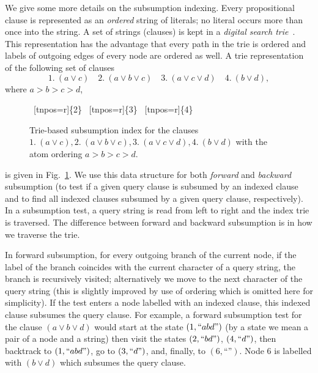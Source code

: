 \documentclass[11pt]{article}
\begin{document}
We give some more details on the subsumption indexing. Every
propositional clause is represented as an \emph{ordered} string of
literals; no literal occurs more than once into the string. A set of
strings (clauses) is kept in a 
\emph{digital search trie}~\cite{Knuth73}. 
This representation has the advantage that  
every path in the trie is ordered and labels of outgoing edges of every node
are ordered as well. A trie representation of the following set of clauses
$$
1.~(a \lor c) \quad
2.~(a \lor b \lor c) \quad
3.~(a \lor c \lor d) \quad
4.~(b \lor d),
$$
where $a>b>c>d$, 
\begin{figure}[hbt]
\begin{center}
{
  {
       {~[tnpos=r]{\{2\}}}
       {~[tnpos=r]{\{3\}}}
  }
  {
     ~[tnpos=r]{\{4\}}
  }
}
\end{center}
\caption{Trie-based subsumption index for the clauses
$
1.~(a \lor c),
2.~(a \lor b \lor c),
3.~(a \lor c \lor d),
4.~(b \lor d)
$ with the atom ordering $a>b>c>d$.
\label{fig:trie}}
\end{figure}
is given in Fig.~\ref{fig:trie}. We use this data structure for both 
\emph{forward} and \emph{backward} subsumption (to test if a given 
query clause is subsumed by an indexed clause and to find all indexed clauses
subsumed by a given query clause, respectively). 
In a subsumption test, a query string is read from left to right
and the index trie is traversed. The difference between forward and backward
subsumption is in how we traverse the trie. 

In forward subsumption, for every outgoing branch of the current node, if the
label of the branch coincides with the current character of a query string,
the branch is recursively visited; alternatively we move to the next
character of
the query string (this is slightly improved by use of ordering which is 
omitted here for simplicity). If the test enters a node labelled with
an indexed clause, this indexed clause subsumes the query clause. 
For example, a forward subsumption test for
the clause $(a\lor b\lor d)$ would start at the state $(1, ``abd\text{''})$ 
(by a state we mean a pair of a node and a string) then visit the states $(2,
``bd\text{''})$,
$(4, ``d\text{''})$, then backtrack to $(1,``abd\text{''})$, go to 
$(3, ``d\text{''})$, and, finally,
to $(6, \text{``''})$. Node $6$ is labelled with $(b \lor d)$ which
subsumes the query clause.
\end{document}
